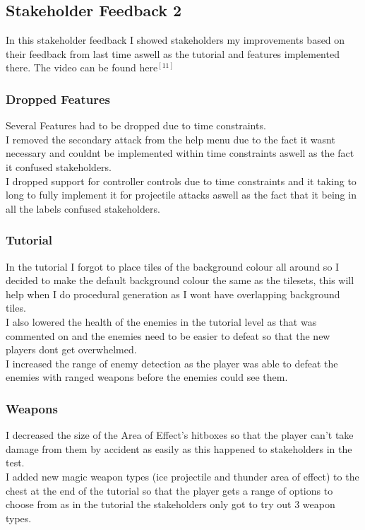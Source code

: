 \documentclass{article}
\begin{document}
        \subsection{Stakeholder Feedback 2}
        In this stakeholder feedback I showed stakeholders my improvements based on their feedback from last time aswell as the tutorial and features implemented there. The video can be found here$^{[11]}$\\
        \subsubsection{Dropped Features}
        Several Features had to be dropped due to time constraints.\\
        I removed the secondary attack from the help menu due to the fact it wasnt necessary and couldnt be implemented within time constraints aswell as the fact it confused stakeholders.\\
        I dropped support for controller controls due to time constraints and it taking to long to fully implement it for projectile attacks aswell as the fact that it being in all the labels confused stakeholders.\\
        \subsubsection{Tutorial}
        In the tutorial I forgot to place tiles of the background colour all around so I decided to make the default background colour the same as the tilesets, this will help when I do procedural generation as I wont have overlapping background tiles.\\
        I also lowered the health of the enemies in the tutorial level as that was commented on and the enemies need to be easier to defeat so that the new players dont get overwhelmed.\\
        I increased the range of enemy detection as the player was able to defeat the enemies with ranged weapons before the enemies could see them.\\
        \subsubsection{Weapons}
        I decreased the size of the Area of Effect's hitboxes so that the player can't take damage from them by accident as easily as this happened to stakeholders in the test.\\
        I added new magic weapon types (ice projectile and thunder area of effect) to the chest at the end of the tutorial so that the player gets a range of options to choose from as in the tutorial the stakeholders only got to try out 3 weapon types.\\
\end{document}
